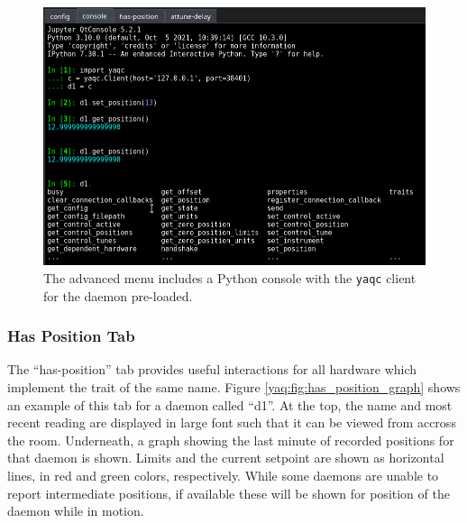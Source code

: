 \begin{figure}
\includegraphics[width=6.5in]{"yaq/images/console"}
\caption[\yaqcqtpy{} Python Console Tab]{
	The advanced menu includes a Python console with the \texttt{yaqc} client for the daemon pre-loaded.
}
\label{yaq:fig:console}
\end{figure}

\subsubsection{Has Position Tab}

The ``has-position'' tab provides useful interactions for all hardware which implement the trait of the same name.
Figure \ref{yaq:fig:has_position_graph} shows an example of this tab for a daemon called ``d1''.
At the top, the name and most recent reading are displayed in large font such that it can be viewed from accross the room.
Underneath, a graph showing the last minute of recorded positions for that daemon is shown.
Limits and the current setpoint are shown as horizontal lines, in red and green colors, respectively.
While some daemons are unable to report intermediate positions, if available these will be shown for position of the daemon while in motion.

